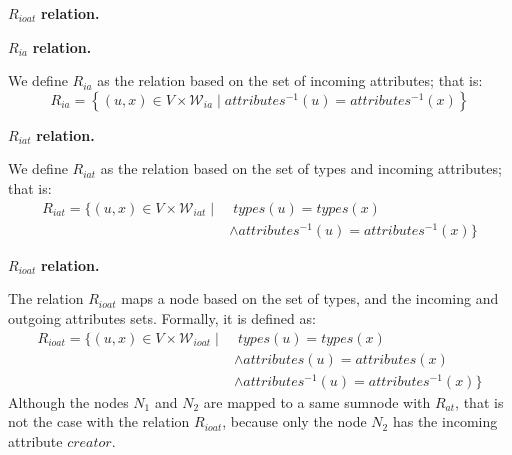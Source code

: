 \begin{labeling}{$R_{ioat}$ \textbf{relation.}}
\item[$R_{ia}$ \textbf{relation.}]

We define $R_{ia}$ as the relation based on the set of incoming attributes; that is:
\begin{equation*}
R_{ia} = \left\lbrace (u, x) \in V \times \mathcal{W}_{ia} \mid attributes^{-1}(u) = attributes^{-1}(x) \right\rbrace
\end{equation*}

\item[$R_{iat}$ \textbf{relation.}]

We define $R_{iat}$ as the relation based on the set of types and incoming attributes; that is:
$$
\begin{aligned}
R_{iat} = \{ (u, x) \in V \times \mathcal{W}_{iat} \mid &\; types(u) = types(x) \\
& \wedge attributes^{-1}(u) = attributes^{-1}(x) \}
\end{aligned}
$$

\item[$R_{ioat}$ \textbf{relation.}]

The relation $R_{ioat}$ maps a node based on the set of types, and the incoming and outgoing attributes sets. Formally, it is defined as:
$$
\begin{aligned}
R_{ioat} = \{ (u, x) \in V \times \mathcal{W}_{ioat} \mid &\; types(u) = types(x) \\
& \wedge attributes(u) = attributes(x) \\
& \wedge attributes^{-1}(u) = attributes^{-1}(x) \}
\end{aligned}
$$
Although the nodes $N_1$ and $N_2$ are mapped to a same sumnode with $R_{at}$, that is not the case with the relation $R_{ioat}$, because only the node $N_2$ has the incoming attribute $creator$.
\end{labeling}

